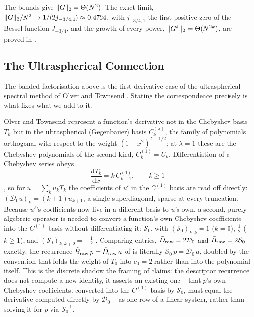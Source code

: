 The bounds give $\|G\|_2=\Theta(N^2)$. The exact limit, $\|G\|_2/N^2\to1/(2j_{-3/4,1})\approx0.4724$, with $j_{-3/4,1}$ the first positive zero of the Bessel function $J_{-3/4}$, and the growth of every power, $\|G^k\|_2=\Theta(N^{2k})$, are proved in .

\subsection{The Ultraspherical Connection}
\label{app:ultraspherical}

The banded factorisation above is the first-derivative case of the
ultraspherical spectral method of Olver and Townsend \cite{olver2013}. Stating
the correspondence precisely is what fixes what we add to it.

Olver and Townsend represent a function's derivative not in the Chebyshev
basis $T_k$ but in the ultraspherical (Gegenbauer) basis $C_k^{(\lambda)}$,
the family of polynomials orthogonal with respect to the weight
$(1-x^2)^{\lambda - 1/2}$; at $\lambda = 1$ these are the Chebyshev
polynomials of the second kind, $C_k^{(1)} = U_k$. Differentiation of a
Chebyshev series obeys
\begin{equation}
    \frac{\mathrm{d}T_k}{\mathrm{d}x} = k\,C^{(1)}_{k-1} , \qquad k \ge 1
    \label{eq:app-ot-diff}
\end{equation}
\cite[Eq.~2.5]{olver2013}, so for $u = \sum_k u_k T_k$ the coefficients of
$u'$ in the $C^{(1)}$ basis are read off directly: $(\mathcal{D}_0 u)_k =
(k+1)u_{k+1}$, a single superdiagonal, sparse at every truncation. Because
$u'$'s coefficients now live in a different basis to $u$'s own, a second,
purely algebraic operator is needed to convert a function's own Chebyshev
coefficients into the $C^{(1)}$ basis without differentiating it:
$\mathcal{S}_0$, with $(\mathcal{S}_0)_{k,k} = 1$ ($k=0$), $\tfrac12$ ($k \ge
1$), and $(\mathcal{S}_0)_{k,k+2} = -\tfrac12$ \cite[Eq.~2.8]{olver2013}.
Comparing entries, $\tilde{D}_\mathrm{raw} = 2\mathcal{D}_0$ and
$\tilde{B}_\mathrm{raw} = 2\mathcal{S}_0$ exactly: the recurrence
$\tilde{B}_\mathrm{raw}\,p = \tilde{D}_\mathrm{raw}\,a$ of
 is literally $\mathcal{S}_0\,p = \mathcal{D}_0\,a$,
doubled by the convention that folds the weight of $T_0$ into $c_0 = 2$
rather than into the polynomial itself. This is the discrete shadow the
framing of  claims: the descriptor
recurrence does not compute a new identity, it asserts an existing one --
that $p$'s own Chebyshev coefficients, converted into the $C^{(1)}$ basis by
$\mathcal{S}_0$, must equal the derivative computed directly by
$\mathcal{D}_0$ -- as one row of a linear system, rather than solving it for
$p$ via $\mathcal{S}_0^{-1}$.

